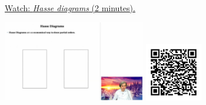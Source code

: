 
\begin{minipage}{10cm}
    \href{https://act4e-spring21.netlify.app/videos/spring2021-tradeoffs:tradeoffs:orders:hasse.html}{Watch: \emph{Hasse diagrams} (2 minutes).}
        
    \href{https://act4e-spring21.netlify.app/videos/spring2021-tradeoffs:tradeoffs:orders:hasse.html}{\includegraphics[height=3.5cm]{spring2021-tradeoffs:tradeoffs:orders:hasse/thumbnails.jpg}}
    \href{https://act4e-spring21.netlify.app/videos/spring2021-tradeoffs:tradeoffs:orders:hasse.html}{\includegraphics[height=2.5cm]{spring2021-tradeoffs:tradeoffs:orders:hasse/qrcode.png}}
\end{minipage}
